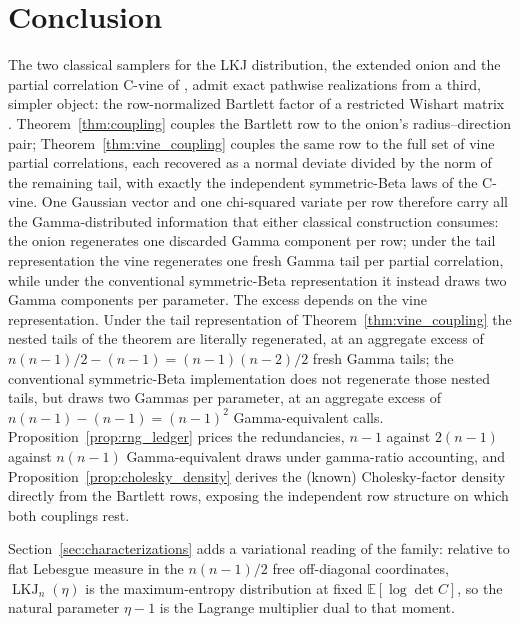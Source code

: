 \documentclass[12pt,english]{article}
\theoremstyle{plain} %
\theoremstyle{definition} %
\theoremstyle{remark} %
\begin{document}
\section{Conclusion}\label{sec:conclusion}

The two classical samplers for the LKJ distribution, the extended onion and the partial correlation C-vine of \citet{LewandowskiKurowickaJoe:2009}, admit exact pathwise realizations from a third, simpler object: the row-normalized Bartlett factor of a restricted Wishart matrix \citep{WangWuChu:2018}. Theorem~\ref{thm:coupling} couples the Bartlett row to the onion's radius--direction pair; Theorem~\ref{thm:vine_coupling} couples the same row to the full set of vine partial correlations, each recovered as a normal deviate divided by the norm of the remaining tail, with exactly the independent symmetric-Beta laws of the C-vine. One Gaussian vector and one chi-squared variate per row therefore carry all the Gamma-distributed information that either classical construction consumes: the onion regenerates one discarded Gamma component per row; under the tail representation the vine regenerates one fresh Gamma tail per partial correlation, while under the conventional symmetric-Beta representation it instead draws two Gamma components per parameter. The excess depends on the vine representation. Under the tail representation of Theorem~\ref{thm:vine_coupling} the nested tails of the theorem are literally regenerated, at an aggregate excess of $n(n-1)/2-(n-1)=(n-1)(n-2)/2$ fresh Gamma tails; the conventional symmetric-Beta implementation does not regenerate those nested tails, but draws two Gammas per parameter, at an aggregate excess of $n(n-1)-(n-1)=(n-1)^2$ Gamma-equivalent calls. Proposition~\ref{prop:rng_ledger} prices the redundancies, $n-1$ against $2(n-1)$ against $n(n-1)$ Gamma-equivalent draws under gamma-ratio accounting, and Proposition~\ref{prop:cholesky_density} derives the (known) Cholesky-factor density directly from the Bartlett rows, exposing the independent row structure on which both couplings rest.

Section~\ref{sec:characterizations} adds a variational reading of the family: relative to flat Lebesgue measure in the $n(n-1)/2$ free off-diagonal coordinates, $\operatorname{LKJ}_n(\eta)$ is the maximum-entropy distribution at fixed $\mathbb{E}[\log\det C]$, so the natural parameter $\eta-1$ is the Lagrange multiplier dual to that moment.
\end{document}
